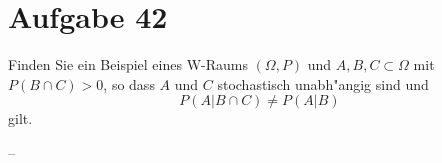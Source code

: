 \section{Aufgabe 42}

Finden Sie ein Beispiel eines W-Raums $(\Omega, P)$ und $A, B, C \subset
\Omega$ mit $P(B \cap C) > 0$, so dass $A$ und $C$ stochastisch unabh"angig
sind und $$P(A|B \cap C) \neq P(A|B)$$ gilt.

--
